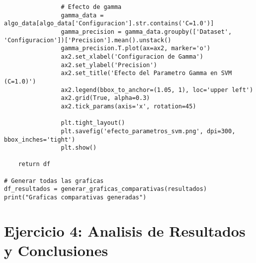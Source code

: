 \documentclass[12pt]{article}
\begin{document}
\begin{lstlisting}
                # Efecto de gamma
                gamma_data = algo_data[algo_data['Configuracion'].str.contains('C=1.0')]
                gamma_precision = gamma_data.groupby(['Dataset', 'Configuracion'])['Precision'].mean().unstack()
                gamma_precision.T.plot(ax=ax2, marker='o')
                ax2.set_xlabel('Configuracion de Gamma')
                ax2.set_ylabel('Precision')
                ax2.set_title('Efecto del Parametro Gamma en SVM (C=1.0)')
                ax2.legend(bbox_to_anchor=(1.05, 1), loc='upper left')
                ax2.grid(True, alpha=0.3)
                ax2.tick_params(axis='x', rotation=45)
                
                plt.tight_layout()
                plt.savefig('efecto_parametros_svm.png', dpi=300, bbox_inches='tight')
                plt.show()
    
    return df

# Generar todas las graficas
df_resultados = generar_graficas_comparativas(resultados)
print("Graficas comparativas generadas")
\end{lstlisting}

\section{Ejercicio 4: Analisis de Resultados y Conclusiones}
\end{document}
